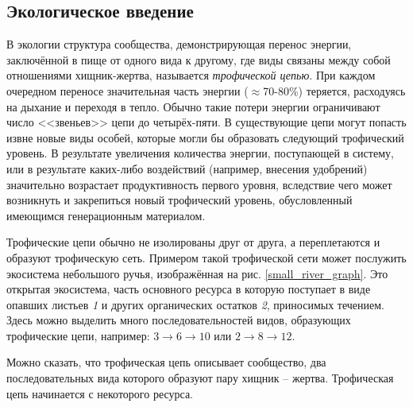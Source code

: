 \subsection{Экологическое введение}
    В экологии структура сообщества, демонстрирующая перенос энергии, заключённой в пище от одного вида к другому, где виды связаны между собой отношениями хищник-жертва, называется \textit{трофической цепью}. При каждом очередном переносе значительная часть энергии (\( \approx \)70-80\%) теряется, расходуясь на дыхание и переходя в тепло. Обычно такие потери энергии ограничивают число <<звеньев>> цепи до четырёх-пяти. В существующие цепи могут попасть извне новые виды особей, которые могли бы образовать следующий трофический уровень. В результате увеличения количества энергии, поступающей в систему, или в результате каких-либо воздействий (например, внесения удобрений) значительно возрастает продуктивность первого уровня, вследствие чего может возникнуть и закрепиться новый трофический уровень, обусловленный имеющимся генерационным материалом.
    
    Трофические цепи обычно не изолированы друг от друга, а переплетаются и образуют трофическую сеть. Примером такой трофической сети может послужить экосистема небольшого ручья\cite{jones_river}, изображённая на рис. \ref{small_river_graph}.
    Это открытая экосистема, часть основного ресурса в которую поступает в виде опавших листьев \textit{1} и других органических остатков \textit{2}, приносимых течением. 
    Здесь можно выделить много последовательностей видов, образующих трофические цепи, например: \(3 \to 6 \to 10\) или \( 2 \to 8 \to 12 \). 

    Можно сказать, что трофическая цепь описывает сообщество, два последовательных вида которого образуют пару хищник -- жертва. Трофическая цепь начинается с некоторого ресурса.


